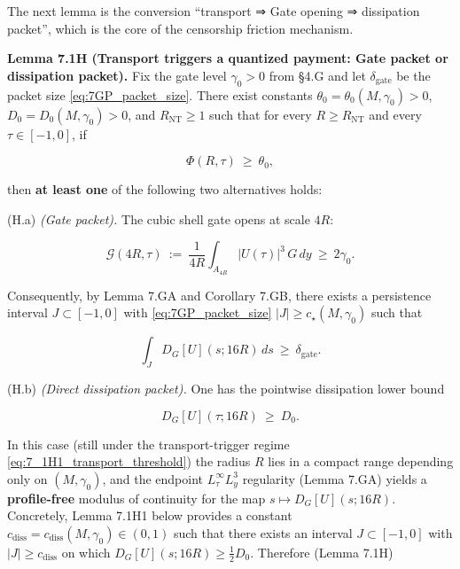\documentclass[
  11pt,
]{article}
\begin{document}
The next lemma is the conversion ``transport ⇒ Gate opening ⇒ dissipation packet'', which is the core of the censorship friction mechanism.

\textbf{Lemma 7.1H (Transport triggers a quantized payment: Gate packet or dissipation packet).} Fix the gate level \(\gamma_0>0\) from §4.G and let \(\delta_{\mathrm{gate}}\) be the packet size \eqref{eq:7GP_packet_size}. There exist constants \(\theta_0=\theta_0(M,\gamma_0)>0\), \(D_0=D_0(M,\gamma_0)>0\), and \(R_{\mathrm{NT}}\ge 1\) such that for every \(R\ge R_{\mathrm{NT}}\) and every \(\tau\in[-1,0]\), if

\begin{equation}
\Phi(R,\tau)\ \ge\ \theta_0,
\tag{7.1H1}\label{eq:7_1H1_transport_threshold}
\end{equation}

then \textbf{at least one} of the following two alternatives holds:

(H.a) \emph{(Gate packet).} The cubic shell gate opens at scale \(4R\):

\begin{equation}
\mathcal G(4R,\tau)\ :=\ \frac1{4R}\int_{A_{4R}}|U(\tau)|^3\,G\,dy\ \ge\ 2\gamma_0.
\tag{7.1H2}\label{eq:7_1H2_gate_opens_from_transport}
\end{equation}

Consequently, by Lemma 7.GA and Corollary 7.GB, there exists a persistence interval \(J\subset[-1,0]\) with \eqref{eq:7GP_packet_size} \(|J|\ge c_\star(M,\gamma_0)\) such that

\begin{equation}
\int_{J}D_G[U](s;16R)\,ds\ \ge\ \delta_{\mathrm{gate}}.
\tag{7.1H3}\label{eq:7_1H3_gate_packet_local}
\end{equation}

(H.b) \emph{(Direct dissipation packet).} One has the pointwise dissipation lower bound

\begin{equation}
D_G[U](\tau;16R)\ \ge\ D_0.
\tag{7.1H4}\label{eq:7_1H4_direct_dissipation_large}
\end{equation}

In this case (still under the transport-trigger regime \eqref{eq:7_1H1_transport_threshold}) the radius \(R\) lies in a compact range depending only on \((M,\gamma_0)\), and the endpoint \(L^\infty_\tau L^3_y\) regularity (Lemma 7.GA) yields a \textbf{profile-free} modulus of continuity for the map \(s\mapsto D_G[U](s;16R)\). Concretely, Lemma 7.1H1 below provides a constant \(c_{\mathrm{diss}}=c_{\mathrm{diss}}(M,\gamma_0)\in(0,1)\) such that there exists an interval \(J\subset[-1,0]\) with \(|J|\ge c_{\mathrm{diss}}\) on which \(D_G[U](s;16R)\ge \tfrac12 D_0\). Therefore (Lemma 7.1H)
\end{document}
